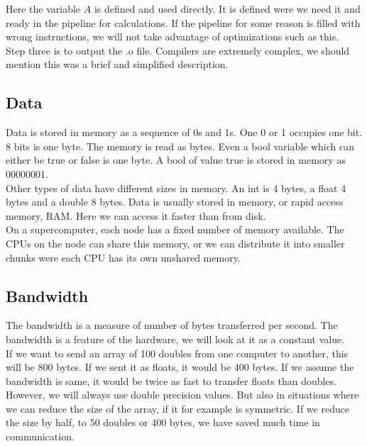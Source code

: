 \documentclass[a4paper,norsk,11pt,twoside]{report}
\begin{document}
Here the variable $A$ is defined and used directly. It is defined were
we need it and ready in the pipeline for calculations. If the pipeline
for some reason is filled with wrong instructions, we will not take
advantage of optimizations such as this. \\

Step three is to output the .o file. Compilers are extremely complex,
we should mention this was a brief and simplified description.

\subsection{Data}
Data is stored in memory as a sequence of 0s and 1s. One 0 or 1
occupies one bit. 8 bits is one byte. The memory is read as
bytes. Even a bool variable which can either be true or false is one byte. A
bool of value true is stored in memory as 00000001. \\

Other types of data have different sizes in memory. An int is 4 bytes,
a float 4 bytes and a double 8 bytes. Data is usually stored in
memory, or rapid access memory, RAM. Here we can access it faster than
from disk. \\

On a supercomputer, each node has a fixed number of memory
available. The CPUs on the node can share this memory, or we can
distribute it into smaller chunks were each CPU has its own unshared
memory.

\subsection{Bandwidth}
The bandwidth is a measure of number of bytes transferred per
second. The bandwidth is a feature of the hardware, we will look at it
as a constant value.\\

If we want to send an array of 100 doubles from one computer to
another, this will be 800 bytes. If we sent it as floats, it would be
400 bytes. If we assume the bandwidth is same, it would be twice as
fast to transfer floats than doubles. \\

However, we will always use double precision values. But also in
situations where we can reduce the size of the array, if it for
example is symmetric. If we reduce the size by half, to 50 doubles or
400 bytes, we have saved much time in communication. \\
\end{document}

